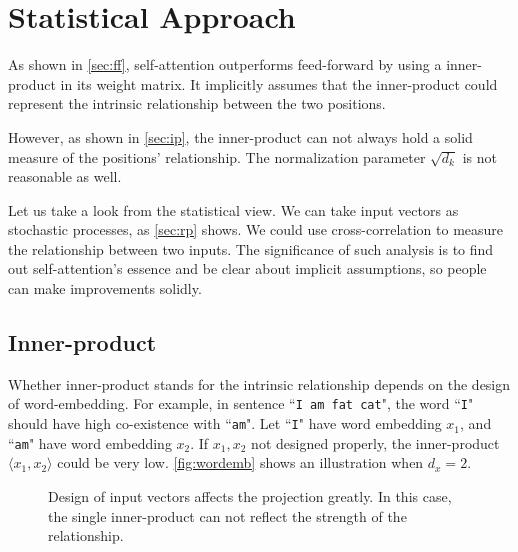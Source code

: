 \documentclass[final]{cvpr}
\begin{document}
\section{Statistical Approach}
\label{sec:statisapp}
As shown in \autoref{sec:ff}, self-attention outperforms feed-forward by using a inner-product in its weight matrix. It implicitly assumes that the inner-product could represent the intrinsic relationship between the two positions. 

However, as shown in \autoref{sec:ip}, the inner-product can not always hold a solid measure of the positions' relationship. The normalization parameter $\sqrt{d_k}$ is not reasonable as well.

Let us take a look from the statistical view. We can take input vectors as stochastic processes, as \autoref{sec:rp} shows. We could use cross-correlation to measure the relationship between two inputs. The significance of such analysis is to find out self-attention's essence and be clear about implicit assumptions, so people can make improvements solidly.

\subsection{Inner-product}
\label{sec:ip}

Whether inner-product stands for the intrinsic relationship depends on the design of word-embedding. For example, in sentence ``{\tt I am fat cat}", the word ``{\tt I}" should have high co-existence with ``{\tt am}". Let ``\texttt{I}" have word embedding $x_1$, and ``\texttt{am}" have word embedding $x_2$. If $x_1, x_2$ not designed properly, the inner-product $\langle x_1, x_2 \rangle$ could be very low. \autoref{fig:wordemb} shows an illustration when $d_x=2$.

\begin{figure}[ht]
\begin{center}
\end{center}
   \caption{Design of input vectors affects the projection greatly. In this case, the single inner-product can not reflect the strength of the relationship.
   }
\label{fig:wordemb}
\end{figure}
\end{document}
